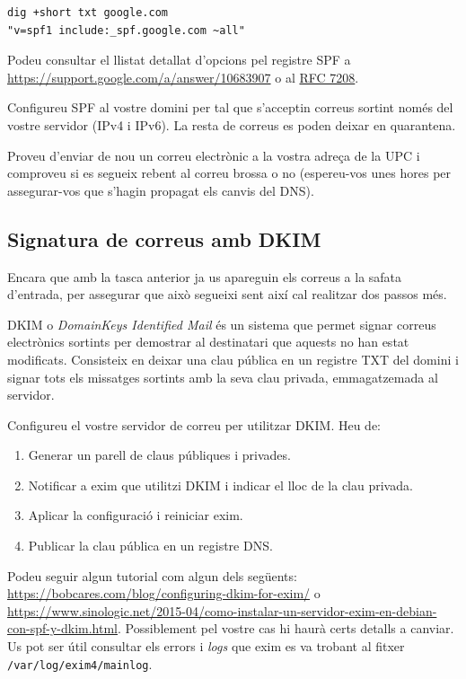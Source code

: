 \documentclass{practicaitic}
\begin{document}
\begin{verbatim}
dig +short txt google.com
"v=spf1 include:_spf.google.com ~all"
\end{verbatim}

Podeu consultar el llistat detallat d'opcions pel registre SPF a
\url{https://support.google.com/a/answer/10683907} o al
\href{https://datatracker.ietf.org/doc/html/rfc7208}{RFC 7208}.

\begin{tasca}
  Configureu SPF al vostre domini per tal que s'acceptin correus sortint només
  del vostre servidor (IPv4 i IPv6). La resta de correus es poden deixar en
  quarantena.

  Proveu d'enviar de nou un correu electrònic a la vostra adreça de la UPC
  i comproveu si es segueix rebent al correu brossa o no (espereu-vos unes hores
  per assegurar-vos que s'hagin propagat els canvis del DNS).
\end{tasca}

\subsection{Signatura de correus amb DKIM}

Encara que amb la tasca anterior ja us apareguin els correus a la safata
d'entrada, per assegurar que això segueixi sent així cal realitzar dos passos
més.

DKIM o \textit{DomainKeys Identified Mail} és un sistema que permet signar
correus electrònics sortints per demostrar al destinatari que aquests no han
estat modificats.
Consisteix en deixar una clau pública en un registre TXT del domini i signar
tots els missatges sortints amb la seva clau privada, emmagatzemada al servidor.

\begin{tasca}
  Configureu el vostre servidor de correu per utilitzar DKIM. Heu de:
  \begin{enumerate}
    \item Generar un parell de claus públiques i privades.
    \item Notificar a exim que utilitzi DKIM i indicar el lloc de la clau privada.
    \item Aplicar la configuració i reiniciar exim.
    \item Publicar la clau pública en un registre DNS.
  \end{enumerate}
\end{tasca}

Podeu seguir algun tutorial com algun dels següents:
\url{https://bobcares.com/blog/configuring-dkim-for-exim/} o \url{https://www.sinologic.net/2015-04/como-instalar-un-servidor-exim-en-debian-con-spf-y-dkim.html}. Possiblement
pel vostre cas hi haurà certs detalls a canviar. Us pot ser útil
consultar els errors i \textit{logs} que exim es va trobant al fitxer
\texttt{/var/log/exim4/mainlog}.
\end{document}
